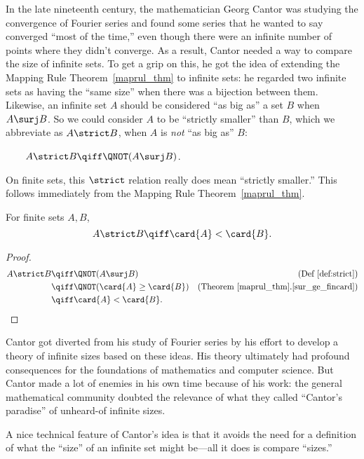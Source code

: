 In the late nineteenth century, the mathematician Georg Cantor%
was studying the convergence of Fourier series and found some series that
he wanted to say converged ``most of the time,'' even though there
were an infinite number of points where they didn't converge.  As a
result, Cantor needed a way to compare the size of infinite sets.  To
get a grip on this, he got the idea of extending the Mapping Rule
Theorem~\ref{maprul_thm}%
to infinite sets: he regarded two infinite
sets as having the ``same size'' when there was a bijection%
between them.  Likewise, an infinite set $A$ should be considered ``as big
as'' a set $B$ when%
$A \surj B$.  So we could consider $A$ to be
``strictly smaller'' than $B$, which we abbreviate as $A \strict B$,%
when $A$ is \emph{not} ``as big as'' $B$:
\begin{definition}\label{def:strict}
$\qquad A \strict B  \qiff \QNOT(A \surj B)$.
\end{definition}
On finite sets, this $\strict$ relation really does mean ``strictly
smaller.''  This follows immediately from the Mapping Rule Theorem~\ref{maprul_thm}.
\begin{corollary}\label{cor:strict}
For finite sets $A,B$,
\[
A \strict B  \qiff \card{A} < \card{B}. 
\]
\end{corollary}

\begin{proof}
\begin{align*}
A \strict B
  & \qiff \QNOT(A \surj B)
    & \text{(Def~\ref{def:strict})}\\
  & \qiff \QNOT(\card{A} \geq \card{B})
    & \text{(Theorem~\ref{maprul_thm}.\eqref{sur_ge_fincard})}\\
  & \qiff \card{A} < \card{B}.
\end{align*}
\end{proof}
Cantor got diverted from his study of Fourier series by his effort to
develop a theory of infinite sizes based on these ideas.  His theory
ultimately had profound consequences for the foundations of
mathematics and computer science.  But Cantor made a lot of enemies in
his own time because of his work: the general mathematical community
doubted the relevance of what they called ``Cantor's paradise''
of unheard-of infinite sizes.

A nice technical feature of Cantor's idea is that it avoids the need
for a definition of what the ``size'' of an infinite set might
be---all it does is compare ``sizes.''


